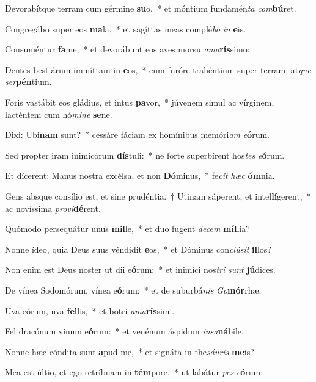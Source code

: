 \item Devorabítque terram cum gérmine \textbf{su}o,~* et móntium fundamén\textit{ta} \textit{com}\textbf{bú}ret.
\item Congregábo super eos \textbf{ma}la,~* et sagíttas meas complé\textit{bo} \textit{in} \textbf{e}is.
\item Consuméntur \textbf{fa}me,~* et devorábunt eos aves morsu \textit{a}\textit{ma}\textbf{rís}simo:
\item Dentes bestiárum immíttam in \textbf{e}os,~* cum furóre trahéntium super terram, at\textit{que} \textit{ser}\textbf{pén}tium.
\item Foris vastábit eos gládius, et intus \textbf{pa}vor,~* júvenem simul ac vírginem, lacténtem cum hó\textit{mi}\textit{ne} \textbf{se}ne.
\item Dixi: Ubi\textbf{nam} sunt?~* cessáre fáciam ex homínibus memóri\textit{am} \textit{e}\textbf{ó}rum.
\item Sed propter iram inimicórum \textbf{dís}tuli:~* ne forte superbírent hos\textit{tes} \textit{e}\textbf{ó}rum.
\item Et dícerent: Manus nostra excélsa, et non \textbf{Dó}minus,~* fe\textit{cit} \textit{hæc} \textbf{óm}nia.
\item Gens absque consílio est, et sine prudéntia.~† Utinam sáperent, et intel\textbf{lí}gerent,~* ac novíssima \textit{pro}\textit{vi}\textbf{dé}rent.
\item Quómodo persequátur unus \textbf{mil}le,~* et duo fugent \textit{de}\textit{cem} \textbf{míl}lia?
\item Nonne ídeo, quia Deus suus véndidit \textbf{e}os,~* et Dóminus con\textit{clú}\textit{sit} \textbf{il}los?
\item Non enim est Deus noster ut dii e\textbf{ó}rum:~* et inimíci nos\textit{tri} \textit{sunt} \textbf{jú}dices.
\item De vínea Sodomórum, vínea e\textbf{ó}rum:~* et de suburbá\textit{nis} \textit{Go}\textbf{mór}rhæ:
\item Uva eórum, uva \textbf{fel}lis,~* et botri \textit{a}\textit{ma}\textbf{rís}simi.
\item Fel dracónum vinum e\textbf{ó}rum:~* et venénum áspidum \textit{in}\textit{sa}\textbf{ná}bile.
\item Nonne hæc cóndita sunt \textbf{a}pud me,~* et signáta in the\textit{sáu}\textit{ris} \textbf{me}is?
\item Mea est últio, et ego retríbuam in \textbf{tém}pore,~* ut labátur \textit{pes} \textit{e}\textbf{ó}rum:
